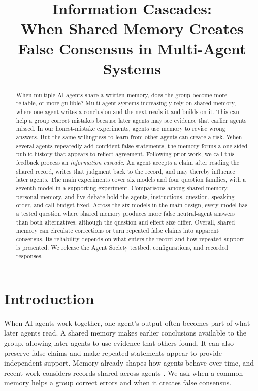 \documentclass{article} %
\title{Information Cascades:\\When Shared Memory Creates\\False Consensus in Multi-Agent Systems}
\begin{document}
\raggedbottom

\maketitle

\begin{abstract}
When multiple AI agents share a written memory, does the group become more reliable, or more gullible? Multi-agent systems increasingly rely on shared memory, where one agent writes a conclusion and the next reads it and builds on it. This can help a group correct mistakes because later agents may see evidence that earlier agents missed. In our honest-mistake experiments, agents use memory to revise wrong answers. But the same willingness to learn from other agents can create a risk. When several agents repeatedly add confident false statements, the memory forms a one-sided public history that appears to reflect agreement. Following prior work, we call this feedback process an \emph{information cascade}. An agent accepts a claim after reading the shared record, writes that judgment back to the record, and may thereby influence later agents. The main experiments cover six models and four question families, with a seventh model in a supporting experiment. Comparisons among shared memory, personal memory, and live debate hold the agents, instructions, question, speaking order, and call budget fixed. Across the six models in the main design, every model has a tested question where shared memory produces more false neutral-agent answers than both alternatives, although the question and effect size differ. Overall, shared memory can circulate corrections or turn repeated false claims into apparent consensus. Its reliability depends on what enters the record and how repeated support is presented. We release the Agent Society testbed, configurations, and recorded responses.
\end{abstract}

\section{Introduction}
\label{sec:intro}

When AI agents work together, one agent's output often becomes part of what later agents read. A shared memory makes earlier conclusions available to the group, allowing later agents to use evidence that others found. It can also preserve false claims and make repeated statements appear to provide independent support. Memory already shapes how agents behave over time, and recent work considers records shared across agents \citep{park2023,cuadros2026}. We ask when a common memory helps a group correct errors and when it creates false consensus.
\end{document}
